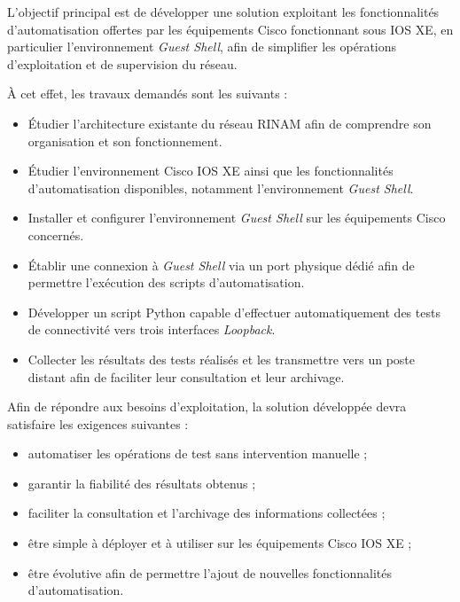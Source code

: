 \documentclass[12pt, a4paper, oneside]{report}
\begin{document}
L'objectif principal est de développer une solution exploitant les fonctionnalités d'automatisation 
offertes par les équipements Cisco fonctionnant sous \ac{IOS XE}, en particulier l'environnement 
\textit{Guest Shell}, afin de simplifier les opérations d'exploitation et de supervision du réseau.

À cet effet, les travaux demandés sont les suivants :

\begin{itemize}
    \item Étudier l'architecture existante du réseau \ac{RINAM} afin de comprendre son 
    organisation et son fonctionnement.
    
    \item Étudier l'environnement Cisco \ac{IOS XE} ainsi que les fonctionnalités 
    d'automatisation disponibles, notamment l'environnement \textit{Guest Shell}.
    
    \item Installer et configurer l'environnement \textit{Guest Shell} sur les équipements Cisco concernés.
    
    \item Établir une connexion à \textit{Guest Shell} via un port physique dédié afin de 
    permettre l'exécution des scripts d'automatisation.
    
    \item Développer un script Python capable d'effectuer automatiquement des tests de 
    connectivité vers trois interfaces \textit{Loopback}.
    
    \item Collecter les résultats des tests réalisés et les transmettre vers un poste 
    distant afin de faciliter leur consultation et leur archivage.
\end{itemize}

Afin de répondre aux besoins d'exploitation, la solution développée devra satisfaire les exigences suivantes :

\begin{itemize}
    \item automatiser les opérations de test sans intervention manuelle ;
    \item garantir la fiabilité des résultats obtenus ;
    \item faciliter la consultation et l'archivage des informations collectées ;
    \item être simple à déployer et à utiliser sur les équipements Cisco \ac{IOS XE} ;
    \item être évolutive afin de permettre l'ajout de nouvelles fonctionnalités d'automatisation.
\end{itemize}
\end{document}
